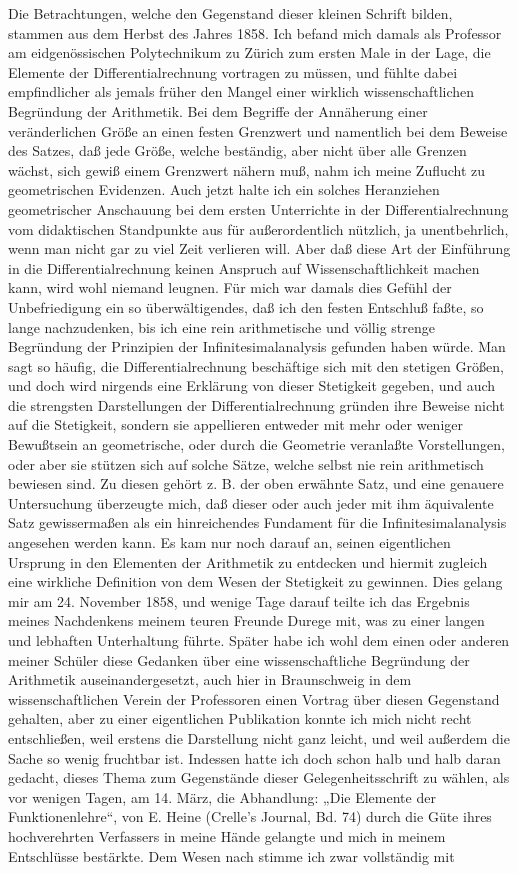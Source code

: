 \documentclass[11pt]{article}
\begin{document}
Die Betrachtungen, welche den Gegenstand dieser kleinen Schrift bilden, stammen aus dem Herbst des Jahres 1858. Ich befand mich damals als Professor am eidgenössischen Polytechnikum zu Zürich zum ersten Male in der Lage, die Elemente der Differentialrechnung vortragen zu müssen, und fühlte dabei empfindlicher als jemals früher den Mangel einer wirklich wissenschaftlichen Begründung der Arithmetik. Bei dem Begriffe der Annäherung einer veränderlichen Größe an einen festen Grenzwert und namentlich bei dem Beweise des Satzes, daß jede Größe, welche beständig, aber nicht über alle Grenzen wächst, sich gewiß einem Grenzwert nähern muß, nahm ich meine Zuflucht zu geometrischen Evidenzen. Auch jetzt halte ich ein solches Heranziehen geometrischer Anschauung bei dem ersten Unterrichte in der Differentialrechnung vom didaktischen Standpunkte aus für außerordentlich nützlich, ja unentbehrlich, wenn man nicht gar zu viel Zeit verlieren will. Aber daß diese Art der Einführung in die Differentialrechnung keinen Anspruch auf Wissenschaftlichkeit machen kann, wird wohl niemand leugnen. Für mich war damals dies Gefühl der Unbefriedigung ein so überwältigendes, daß ich den festen Entschluß faßte, so lange nachzudenken, bis ich eine rein arithmetische und völlig strenge Begründung der Prinzipien der Infinitesimalanalysis gefunden haben würde. Man sagt so häufig, die Differentialrechnung beschäftige sich mit den stetigen Größen, und doch wird nirgends eine Erklärung von dieser Stetigkeit gegeben, und auch die strengsten Darstellungen der Differentialrechnung gründen ihre Beweise nicht auf die Stetigkeit, sondern sie appellieren entweder mit mehr oder weniger Bewußtsein an geometrische, oder durch die Geometrie veranlaßte Vorstellungen, oder aber sie stützen sich auf solche Sätze, welche selbst nie rein arithmetisch bewiesen sind. Zu diesen gehört z. B. der oben erwähnte Satz, und eine genauere Untersuchung überzeugte mich, daß dieser oder auch jeder mit ihm äquivalente Satz gewissermaßen als ein hinreichendes Fundament für die Infinitesimalanalysis angesehen werden kann. Es kam nur noch darauf an, seinen eigentlichen Ursprung in den Elementen der Arithmetik zu entdecken und hiermit zugleich eine wirkliche Definition von dem Wesen der Stetigkeit zu gewinnen. Dies gelang mir am 24. November 1858, und wenige Tage darauf teilte ich das Ergebnis meines Nachdenkens meinem teuren Freunde Durege mit, was zu einer langen und lebhaften Unterhaltung führte. Später habe ich wohl dem einen oder anderen meiner Schüler diese Gedanken über eine wissenschaftliche Begründung der Arithmetik auseinandergesetzt, auch hier in Braunschweig in dem wissenschaftlichen Verein der Professoren einen Vortrag über diesen Gegenstand gehalten, aber zu einer eigentlichen Publikation konnte ich mich nicht recht entschließen, weil erstens die Darstellung nicht ganz leicht, und weil außerdem die Sache so wenig fruchtbar ist. Indessen hatte ich doch schon halb und halb daran gedacht, dieses Thema zum Gegenstände dieser Gelegenheitsschrift zu wählen, als vor wenigen Tagen, am 14. März, die Abhandlung: „Die Elemente der Funktionenlehre“, von E. Heine (Crelle's Journal, Bd. 74) durch die Güte ihres hochverehrten Verfassers in meine Hände gelangte und mich in meinem Entschlüsse bestärkte. Dem Wesen nach stimme ich zwar vollständig mit 
\end{document}
